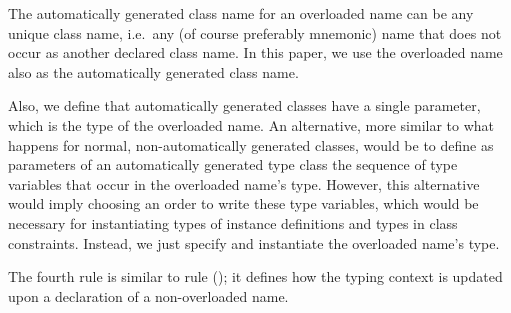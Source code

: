 The automatically generated class name for an overloaded name can be
any unique class name, i.e.~any (of course preferably mnemonic) name
that does not occur as another declared class name. In this paper, we
use the overloaded name also as the automatically generated class
name.

Also, we define that automatically generated classes have a single
parameter, which is the type of the overloaded name. An alternative,
more similar to what happens for normal, non-automatically generated
classes, would be to define as parameters of an automatically
generated type class the sequence of type variables that occur in the
overloaded name's type. However, this alternative would imply choosing
an order to write these type variables, which would be necessary for
instantiating types of instance definitions and types in class
constraints. Instead, we just specify and instantiate the overloaded
name's type. 

The fourth rule is similar to rule (\LET); it defines how the typing
context is updated upon a declaration of a non-overloaded name.





%
%
